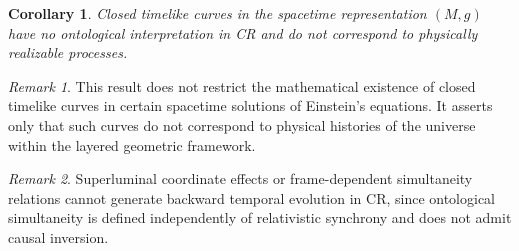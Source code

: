 \documentclass[11pt,a4paper]{article}
\theoremstyle{plain}
\newtheorem{corollary}{Corollary}
\theoremstyle{definition}
\theoremstyle{remark}
\newtheorem{remark}{Remark}
\begin{document}
\begin{corollary}
Closed timelike curves in the spacetime representation $(M,g)$ have no ontological interpretation in CR and do not correspond to physically realizable processes.
\end{corollary}

\begin{remark}
This result does not restrict the mathematical existence of closed timelike curves in certain spacetime solutions of Einstein's equations. It asserts only that such curves do not correspond to physical histories of the universe within the layered geometric framework.
\end{remark}

\begin{remark}
Superluminal coordinate effects or frame-dependent simultaneity relations cannot generate backward temporal evolution in CR, since ontological simultaneity is defined independently of relativistic synchrony and does not admit causal inversion.
\end{remark}
\end{document}
